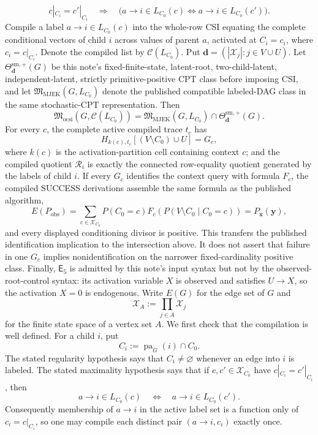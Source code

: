 \[
c|_{C_i}=c'|_{C_i}
\quad\Longrightarrow\quad
\bigl(a\to i\in L_{C_0}(c)\Longleftrightarrow a\to i\in L_{C_0}(c')\bigr).
\]
Compile a label \(a\to i\in L_{C_0}(c)\) into the whole-row CSI equating the complete conditional vectors of child \(i\) across values of parent \(a\), activated at \(C_i=c_i\), where \(c_i=c|_{C_i}\). Denote the compiled list by \(\mathcal C(L_{C_0})\). Put \(\mathbf d=(|\mathcal X_j|:j\in V\cup U)\). Let \(\Theta^{\mathrm{sm},+}_{\mathbf d}(G)\) be this note's fixed-finite-state, latent-root, two-child-latent, independent-latent, strictly primitive-positive CPT class before imposing CSI, and let \(\mathfrak M_{\mathrm{MJEK}}(G,L_{C_0})\) denote the published compatible labeled-DAG class in the same stochastic-CPT representation. Then
\[
\mathfrak M_{\mathrm{ocsi}}\!\left(G,\mathcal C(L_{C_0})\right)
=
\mathfrak M_{\mathrm{MJEK}}(G,L_{C_0})
\cap \Theta^{\mathrm{sm},+}_{\mathbf d}(G).
\]
For every \(c\), the complete active compiled trace \(t_c\) has
\[
H_{k(c),t_c}[(V\setminus C_0)\cup U]=G_c,
\]
where \(k(c)\) is the activation-partition cell containing context \(c\); and the compiled quotient \(\mathcal R_i\) is exactly the connected row-equality quotient generated by the labels of child \(i\). If every \(G_c\) identifies the context query with formula \(F_c\), the compiled SUCCESS derivations assemble the same formula as the published algorithm,
\[
E(P_{\mathrm{obs}})
=\sum_{c\in\mathcal X_{C_0}}P(C_0=c)
F_c\!\left(P(V\setminus C_0\mid C_0=c)\right)
=P_{\mathbf x}(\mathbf y),
\]
and every displayed conditioning divisor is positive. This transfers the published identification implication to the intersection above. It does not assert that failure in one \(G_c\) implies nonidentification on the narrower fixed-cardinality positive class. Finally, \(\mathsf E_5\) is admitted by this note's input syntax but not by the observed-root-control syntax: its activation variable \(X\) is observed and satisfies \(U\to X\), so the activation \(X=0\) is endogenous.
Write \(E(G)\) for the edge set of \(G\) and
\[
\mathcal X_A:=\prod_{j\in A}\mathcal X_j
\]
for the finite state space of a vertex set \(A\). We first check that the compilation is well defined. For a child \(i\), put
\[
C_i:=\operatorname{pa}_G(i)\cap C_0.
\]
The stated regularity hypothesis says that \(C_i\neq\varnothing\) whenever an edge into \(i\) is labeled. The stated maximality hypothesis says that if \(c,c'\in\mathcal X_{C_0}\) have \(c|_{C_i}=c'|_{C_i}\), then
\[
a\to i\in L_{C_0}(c)
\quad\Longleftrightarrow\quad
a\to i\in L_{C_0}(c').
\]
Consequently membership of \(a\to i\) in the active label set is a function only of \(c_i=c|_{C_i}\), so one may compile each distinct pair \((a\to i,c_i)\) exactly once.

